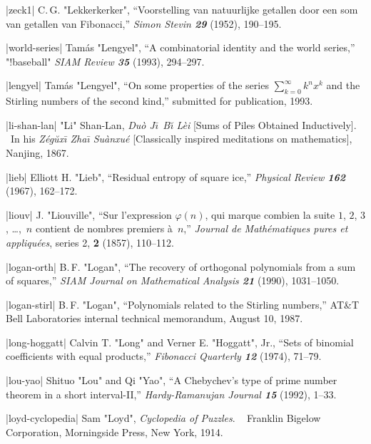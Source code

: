 \bib|zeck1|%
C.\,G. "Lekkerkerker", ``Voorstelling van natuurlijke getallen door een som
van getallen van Fibonacci,'' {\sl Simon Stevin\/ \bf29} (1952), 190--195.

\bib|world-series|%
Tam\'as "Lengyel", ``A combinatorial identity and the world series,''
"!baseball"
{\sl SIAM Review\/ \bf35} (1993), 294--297.

\bib|lengyel|%
Tam\'as "Lengyel", ``On some properties of the series $\sum_{k=0}^\infty
k^nx^k$ and the Stirling numbers of the second kind,''
submitted for publication, 1993.

\bib|li-shan-lan|%
"Li" Shan-Lan, {\sl Du\`o J\=\i\ B\u{\i} L\`ei\/} [Sums of Piles Obtained
Inductively]. \ In his {\sl Z\'eg\u{u}x\={\i} Zha\={\i} Su\`anxu\'e\/}
[Classically inspired meditations on mathematics], Nanjing, 1867.

\bib|lieb|%
Elliott H. "Lieb", ``Residual entropy of square ice,''
{\sl Physical Review\/ \bf162} (1967), 162--172.

\bib|liouv|%
J. "Liouville", ``Sur l'expression $\varphi(n)$, qui marque combien la suite
$1$, $2$, $3$, \dots,~$n$ contient de nombres premiers \`a~$n$,''
{\sl Journal de Math\'e\-ma\-tiques pures et appliqu\'ees}, series 2, {\bf2}
(1857), 110--112.

\bib|logan-orth|%
B.\,F. "Logan", ``The recovery of orthogonal polynomials from a sum of squares,''
{\sl SIAM Journal on Mathematical Analysis\/ \bf21} (1990), 1031--1050.

\bib|logan-stirl|%
B.\,F. "Logan", ``Polynomials related to the Stirling numbers,'' AT\&T Bell
Laboratories internal technical memorandum, August 10, 1987.

\bib|long-hoggatt|%
Calvin T. "Long" and Verner E. "Hoggatt", Jr., ``Sets of binomial coefficients
with equal products,'' {\sl Fibonacci Quarterly\/ \bf12} (1974), 71--79.

\bib|lou-yao|%
Shituo "Lou" and Qi "Yao", ``A Chebychev's %
type of prime number theorem in a short interval-II,''
{\sl Hardy-Ramanujan Journal\/ \bf15} (1992), 1--33.

\bib|loyd-cyclopedia|%
Sam "Loyd", {\sl Cyclopedia of Puzzles}. \
Franklin Bigelow Corporation, Morningside Press, New York, 1914.

